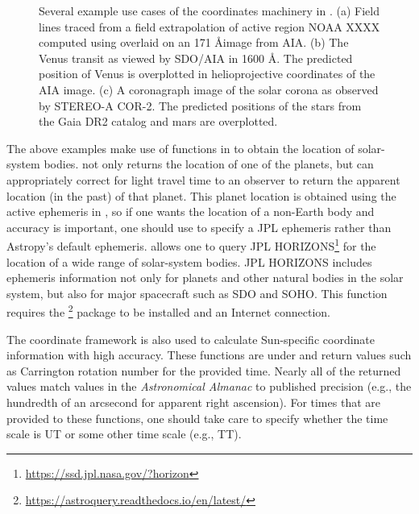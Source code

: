 \begin{figure}
    \caption{Several example use cases of the coordinates machinery in \sunpy.
    (a) Field lines traced from a field extrapolation of active region NOAA XXXX computed using  overlaid on an 171 \AA image from AIA.
    (b) The Venus transit as viewed by SDO/AIA in 1600 \AA. The predicted position of Venus is overplotted in helioprojective coordinates of the AIA image.
    (c) A coronagraph image of the solar corona as observed by STEREO-A COR-2. The predicted positions of the stars from the Gaia DR2 catalog and mars are overplotted.}
    \label{fig:coordinates_examples}
\end{figure}

The above examples make use of functions in  to obtain the location of solar-system bodies.
 not only returns the location of one of the planets, but can appropriately correct for light travel time to an observer to return the apparent location (in the past) of that planet.
This planet location is obtained using the active ephemeris in , so if one wants the location of a non-Earth body and accuracy is important, one should use  to specify a JPL ephemeris rather than Astropy's default ephemeris.
 allows one to query JPL HORIZONS\footnote{\url{https://ssd.jpl.nasa.gov/?horizon}} for the location of a wide range of solar-system bodies.
JPL HORIZONS includes ephemeris information not only for planets and other natural bodies in the solar system, but also for major spacecraft such as SDO and SOHO.
This function requires the \footnote{\url{https://astroquery.readthedocs.io/en/latest/}} package to be installed and an Internet connection.

The coordinate framework is also used to calculate Sun-specific coordinate information with high accuracy.
These functions are under  and return values such as Carrington rotation number for the provided time.
Nearly all of the returned values match values in the \textit{Astronomical Almanac} to published precision (e.g., the hundredth of an arcsecond for apparent right ascension).
For times that are provided to these functions, one should take care to specify whether the time scale is UT or some other time scale (e.g., TT).

